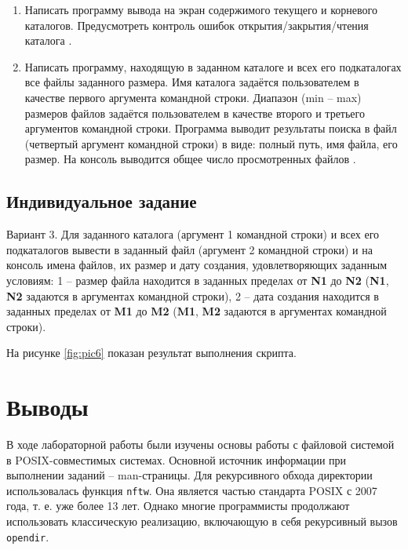\begin{enumerate}[listparindent=\fivecharsapprox]
	\item Написать программу вывода на экран содержимого текущего и корневого каталогов.
		Предусмотреть контроль ошибок открытия/закрытия/чтения каталога .



	\item Написать программу, находящую в заданном каталоге и всех его подкаталогах все файлы заданного размера.
Имя каталога задаётся пользователем в качестве первого аргумента командной строки.
Диапазон (min -- max) размеров файлов задаётся пользователем в качестве второго и третьего аргументов командной строки.
Программа выводит результаты поиска в файл (четвертый аргумент командной строки) в виде: полный путь, имя файла, его размер.
На консоль выводится общее число просмотренных файлов .



\end{enumerate}

\subsection{Индивидуальное задание}
\label{sec:job:personal_task}

Вариант 3. Для заданного каталога (аргумент 1 командной строки) и всех его подкаталогов вывести в заданный файл (аргумент 2 командной строки) и на консоль имена файлов, их размер и дату создания, удовлетворяющих заданным условиям: 1 – размер файла находится в заданных пределах от \textbf{N1} до \textbf{N2} (\textbf{N1}, \textbf{N2} задаются в аргументах командной строки), 2 – дата создания находится в заданных пределах от \textbf{M1} до \textbf{M2} (\textbf{M1}, \textbf{M2} задаются в аргументах командной строки).



На рисунке \ref{fig:pic6} показан результат выполнения скрипта.


\section{Выводы}
\label{sec:out}

В ходе лабораторной работы были изучены основы работы с файловой системой в POSIX-совместимых системах. Основной источник информации при выполнении заданий -- man-страницы.
Для рекурсивного обхода директории использовалась функция \lstinline{nftw}. Она является частью стандарта POSIX с 2007 года, т. е. уже более 13 лет.
Однако многие программисты продолжают использовать классическую реализацию, включающую в себя рекурсивный вызов \lstinline{opendir}.
